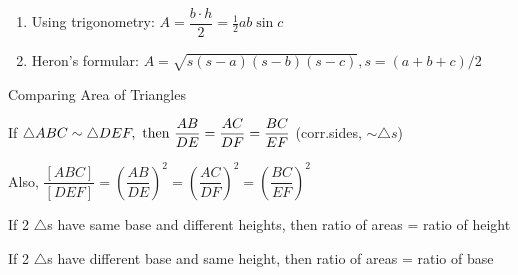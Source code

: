
\begin{mysubsection}{}
    \begin{enumerate}
        \item Using trigonometry: $A=\dfrac{b\cdot h}{2}=\frac{1}{2} ab\sin c$
        \item Heron's formular: $A=\sqrt{s(s-a)(s-b)(s-c)}, s = (a+b+c)/2$
    \end{enumerate}
\end{mysubsection}

\begin{mysubsection}{Comparing Area of Triangles}

    If $\triangle ABC \sim \triangle DEF, \textnormal{ then }\dfrac{AB}{DE}=\dfrac{AC}{DF}=\dfrac{BC}{EF}$ (corr.sides, $\sim\triangle s$)

    Also, $\dfrac{[ABC]}{[DEF]}=\left(\dfrac{AB}{DE}\right)^2=\left(\dfrac{AC}{DF}\right)^2=\left(\dfrac{BC}{EF}\right)^2$


    If 2 $\triangle $s have same base and different heights, then ratio of areas = ratio of height

    If 2 $\triangle $s have different base and same height, then ratio of areas = ratio of base
\end{mysubsection}

